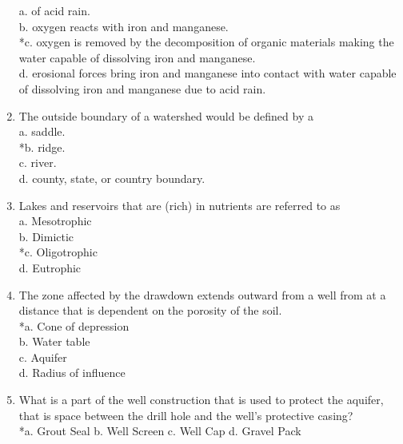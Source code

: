 \begin{enumerate}
a. of acid rain.\\
b. oxygen reacts with iron and manganese.\\
*c. oxygen is removed by the decomposition of organic materials making the water capable of dissolving iron and manganese.\\
d. erosional forces bring iron and manganese into contact with water capable of dissolving iron and manganese due to acid rain.\\
\item The outside boundary of a watershed would be defined by a\\
a. saddle.\\
*b. ridge.\\
c. river.\\
d. county, state, or country boundary.\\
\item Lakes and reservoirs that are (rich) in nutrients are referred to as\\
a.  Mesotrophic\\
b.  Dimictic\\
*c.  Oligotrophic\\
d.  Eutrophic\\
\item The zone affected by the drawdown extends outward from a well from at a distance that is dependent on the porosity of the soil.\\
*a.  Cone of depression\\
b.  Water table\\
c.  Aquifer\\
d.  Radius of influence\\

\item What is a part of the well construction that is used to protect the aquifer, that is space between the drill hole and the well's protective casing?\\
*a. Grout Seal
b. Well Screen
c. Well Cap
d. Gravel Pack
\end{enumerate}